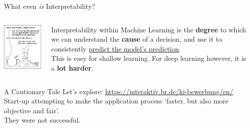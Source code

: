 \documentclass{beamer}
\begin{document}
\begin{frame}{What even \textit{is} Interpretability?}
	\begin{columns}
		\begin{column}{0.5\textwidth}
			\begin{center}
				\includegraphics[width=5cm]{img/1838} \pause
			\end{center}
		\end{column}
		\begin{column}{0.5\textwidth}
			Interpretability within Machine Learning is the \textbf{degree} to which we can understand the \textbf{cause} of a decision, and use it to consistently \underline{predict the model's prediction}. \pause \newline \\

			This is easy for shallow learning. \pause For deep learning however, it is a \textbf{lot harder}.
		\end{column}
	\end{columns}
\end{frame}

\begin{frame}{A Cautionary Tale}
	Let's explore: \url{https://interaktiv.br.de/ki-bewerbung/en/} \newline \\

	Start-up attempting to make the application process `faster, but also more objective and fair'. \pause \newline \\
	They were not successful.
\end{frame}
\end{document}
